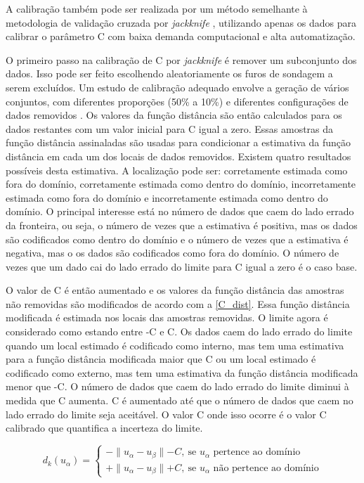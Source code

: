 A calibração também pode ser realizada por um método semelhante à metodologia de validação cruzada por \textit{jackknife} \cite{wilde2012kriging}, utilizando apenas os dados para calibrar o parâmetro C com baixa demanda computacional e alta automatização.

O primeiro passo na calibração de C por \textit{jackknife} é remover um subconjunto dos dados. Isso pode ser feito escolhendo aleatoriamente os furos de sondagem a serem excluídos. Um estudo de calibração adequado envolve a geração de vários conjuntos, com diferentes proporções (50\% a 10\%) e diferentes configurações de dados removidos \cite{manchuck}. Os valores da função distância são então calculados para os dados restantes com um valor inicial para C igual a zero. Essas amostras da função distância assinaladas são usadas para condicionar a estimativa da função distância em cada um dos locais de dados removidos. Existem quatro resultados possíveis  desta estimativa. A localização pode ser: corretamente estimada como fora do domínio, corretamente estimada como dentro do domínio, incorretamente estimada como fora do domínio e incorretamente estimada como dentro do domínio. O principal interesse está no número de dados que caem do lado errado da fronteira, ou seja, o número de vezes que a estimativa é positiva, mas os dados são codificados como dentro do domínio e o número de vezes que a estimativa é negativa, mas o os dados são codificados como fora do domínio. O número de vezes que um dado cai do lado errado do limite para C igual a zero é o caso base.

O valor de C é então aumentado e os valores da função distância das amostras não removidas são modificados de acordo com a \autoref{C_dist}. Essa função distância modificada é estimada nos locais das amostras removidas. O limite agora é considerado como estando entre -C e C. Os dados caem do lado errado do limite quando um local estimado é codificado como interno, mas tem uma estimativa para a função distância modificada maior que C ou um local estimado é codificado como externo, mas tem uma estimativa da função distância modificada menor que -C. O número de dados que caem do lado errado do limite diminui à medida que C aumenta. C é aumentado até que o número de dados que caem no lado errado do limite seja aceitável. O valor C onde isso ocorre é o valor C calibrado que quantifica a incerteza do limite.

\begin{equation}
	d_k(u_\alpha)=\begin{cases}
	-\parallel u_\alpha-u_\beta\parallel - C,\:\textrm{se $u_\alpha$ pertence ao domínio}\\
	+\parallel u_\alpha-u_\beta\parallel + C,\:\textrm{se $u_\alpha$ não pertence ao domínio}\end{cases}
    \label{C_dist}
\end{equation}

